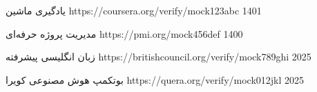 \begin{certifications}
  \certificate
    {یادگیری ماشین}
    {}
    {https://coursera.org/verify/mock123abc}
    {1401}

  \certificate
    {مدیریت پروژه حرفه‌ای}
    {}
    {https://pmi.org/mock456def}
    {1400}

  \certificate
    {زبان انگلیسی پیشرفته}
    {}
    {https://britishcouncil.org/verify/mock789ghi}
    {2025}
    
  \certificate
    {بوتکمپ هوش مصنوعی}
    {کويرا}
    {https://quera.org/verify/mock012jkl}
    {2025}
\end{certifications}
